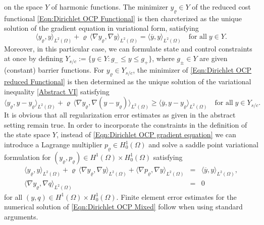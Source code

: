 \documentclass{article}
\numberwithin{equation}{section}
\begin{document}
on the space $Y$ of harmonic functions.
The minimizer $y_\varrho \in Y$ of the reduced cost functional
\eqref{Eqn:Dirichlet OCP Functional} is then charcterized as the unique
solution of the gradient equation in variational form, satisfying
\begin{equation}\label{Eqn:Dirichlet OCP gradient equation}
  \langle y_\varrho , y \rangle_{L^2(\Omega)} + \varrho \,
  \langle \nabla y_\varrho , \nabla y \rangle_{L^2(\Omega)} =
  \langle \overline{y} , y \rangle_{L^2(\Omega)} \quad
  \mbox{for all} \; y \in Y .
\end{equation}
Moreover, in this particular case, we can formulate state and control
constraints at once by defining
$Y_{s/c} := \{ y \in Y : g_- \leq y \leq g_+ \}$, where $g_\pm \in Y$ are
given (constant) barrier functions. For $y_\varrho \in Y_{s/c}$, the
minimizer of \eqref{Eqn:Dirichlet OCP reduced Functional} is then
determined as the unique solution of the variational inequality
\eqref{Abstract VI} satisfying
\begin{equation}\label{Eqn:Dirichlet OCP VI}
 \langle y_\varrho , y-y_\varrho \rangle_{L^2(\Omega)} + \varrho \,
  \langle \nabla y_\varrho , \nabla (y-y_\varrho) \rangle_{L^2(\Omega)} \geq
  \langle \overline{y} , y - y_\varrho \rangle_{L^2(\Omega)} \quad
  \mbox{for all} \; y \in Y_{s/c} .
\end{equation}
It is obvious that all regularization error estimates as given
in the abstract setting remain true.
In order to incorporate the constraints in the definition of the state
space $Y$, instead of \eqref{Eqn:Dirichlet OCP gradient equation} we
can introduce a Lagrange multiplier $p_\varrho \in H^1_0(\Omega)$ and
solve a saddle point variational formulation for
$(y_\varrho , p_\varrho) \in H^1(\Omega) \times H^1_0(\Omega)$ satisfying
\begin{equation}\label{Eqn:Dirichlet OCP Mixed}
  \begin{array}{lcl}
  \langle y_\varrho , y \rangle_{L^2(\Omega)} + \varrho \,
  \langle \nabla y_\varrho , \nabla y \rangle_{L^2(\Omega)}
  + \langle \nabla p_\varrho , \nabla y \rangle_{L^2(\Omega)}
  & = & \langle \overline{y} , y \rangle_{L^2(\Omega)}, \\[1mm]
    \langle \nabla y_\varrho , \nabla q \rangle_{L^2(\Omega)}
    & = & 0
  \end{array}
\end{equation}
for all $(y,q) \in H^1(\Omega) \times H^1_0(\Omega)$. Finite element
error estimates for the numerical solution of \eqref{Eqn:Dirichlet OCP Mixed}
follow when using standard arguments.
\end{document}
